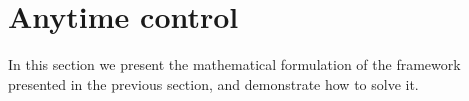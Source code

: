 \section{Anytime control}
\label{controlProblem}
In this section we present the mathematical formulation of the framework presented in the previous section, and demonstrate how to solve it.



